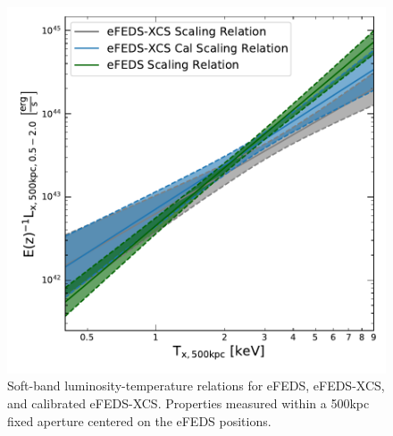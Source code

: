 \documentclass[fleqn,usenatbib]{mnras}
\begin{document}
\begin{figure}
    \centering
    \includegraphics[width=1\columnwidth]{images/efeds_lt52.pdf}
    \caption[]{Soft-band luminosity-temperature relations for eFEDS, eFEDS-XCS, and calibrated eFEDS-XCS. Properties measured within a 500kpc fixed aperture centered on the eFEDS positions.}
    \label{fig:prelimlt}
\end{figure}
\end{document}
